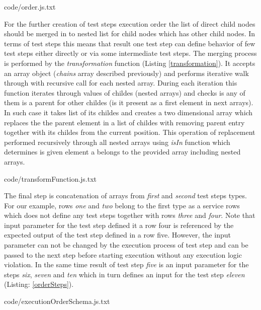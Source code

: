 
{code/order.js.txt}

For the further creation of test steps execution order the list of direct child nodes should be merged in to nested list for child nodes which has other child nodes. In terms of test steps this means that result one test step can define behavior of few test steps either directly or via some intermediate test steps. 
The merging process is performed by the \textit{transformation} function (Listing \ref{transformation}). It accepts an array object (\textit{chains} array described previously) and performs iterative walk through with recursive call for each nested array. During each iteration this function iterates through values of childes (nested arrays) and checks is any of them is a parent for other childes (is it present as a first element in next arrays). In such case it takes list of its childes and creates a two dimensional array which replaces the the parent element in a list of childes with removing parent entry together with its childes from the current position. This operation of replacement performed recursively through all nested arrays using \textit{isIn} function which determines is given element a belongs to the provided array including nested arrays.


{code/transformFunction.js.txt}

The final step is concatenation of arrays from \textit{first} and \textit{second} test steps types. For our example, rows \textit{one} and \textit{two} belong to the first type as a service rows which does not define any test steps together with rows \textit{three} and \textit{four}. Note that input parameter for the test step defined it a row four is referenced by the expected output of the test step defined in a row five. However, the input parameter can not be changed by the execution process of test step and can be passed to the next step before starting execution without any execution logic violation. In the same time result of test step \textit{five} is an input parameter for the steps \textit{six}, \textit{seven} and \textit{ten} which in turn defines an input for the test step \textit{eleven} (Listing: \ref{orderSteps}).

{code/executionOrderSchema.js.txt}


